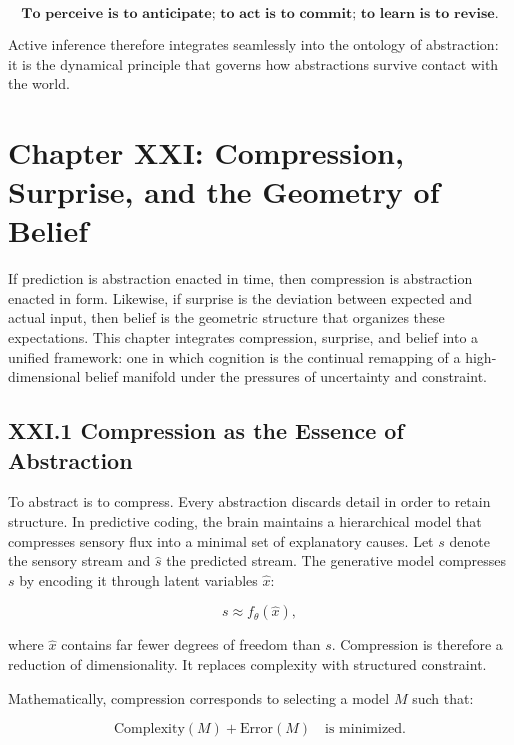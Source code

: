 \documentclass[11pt,letterpaper]{article}
\begin{document}
\[
\textbf{To perceive is to anticipate; to act is to commit; to learn is to revise.}
\]

Active inference therefore integrates seamlessly into the ontology of abstraction:  
it is the dynamical principle that governs how abstractions survive contact with the world.

\newpage
\section{Chapter XXI: Compression, Surprise, and the Geometry of Belief}

If prediction is abstraction enacted in time, then compression is abstraction enacted in form. Likewise, if surprise is the deviation between expected and actual input, then belief is the geometric structure that organizes these expectations. This chapter integrates compression, surprise, and belief into a unified framework: one in which cognition is the continual remapping of a high-dimensional belief manifold under the pressures of uncertainty and constraint.

\subsection{XXI.1 Compression as the Essence of Abstraction}

To abstract is to compress. Every abstraction discards detail in order to retain structure. In predictive coding, the brain maintains a hierarchical model that compresses sensory flux into a minimal set of explanatory causes. Let \(s\) denote the sensory stream and \(\hat{s}\) the predicted stream. The generative model compresses \(s\) by encoding it through latent variables \(\hat{x}\):

\[
s \approx f_\theta(\hat{x}),
\]

where \(\hat{x}\) contains far fewer degrees of freedom than \(s\).  
Compression is therefore a reduction of dimensionality. It replaces complexity with structured constraint.

Mathematically, compression corresponds to selecting a model \(M\) such that:

\[
\text{Complexity}(M) + \text{Error}(M) \quad \text{is minimized.}
\]
\end{document}
